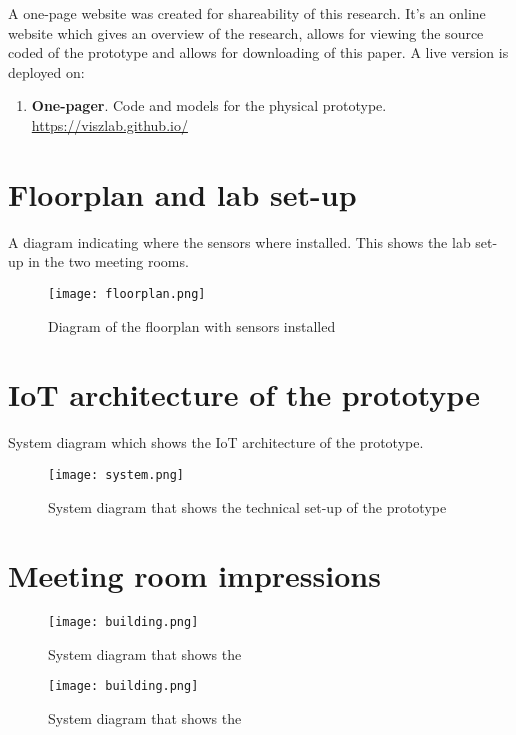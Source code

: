 \begin{appendices}
A one-page website was created for shareability of this research. It's an online website which gives an overview of the research, allows for viewing the source coded of the prototype and allows for downloading of this paper. A live version is deployed on:

\begin{enumerate}
  \item \textbf{One-pager}. Code and models for the physical prototype.\\
  \underline{https://viszlab.github.io/}
\end{enumerate}

\pagebreak

\section{Floorplan and lab set-up}
\label{sec:apx:first_appendix}

A diagram indicating where the sensors where installed. This shows the lab set-up in the two meeting rooms.

\begin{figure}[H]
    \centering
    \texttt{[image: floorplan.png]}
    \caption{Diagram of the floorplan with sensors installed}
    \label{fig:timeline}
\end{figure}

\section{IoT architecture of the prototype}
\label{sec:apx:first_appendix}

System diagram which shows the IoT architecture of the prototype.

\begin{figure}[H]
    \centering
    \texttt{[image: system.png]}
    \caption{System diagram that shows the technical set-up of the prototype}
    \label{fig:timeline}
\end{figure}

\pagebreak

\section{Meeting room impressions}
\label{sec:apx:first_appendix}

\begin{figure}[H]
\begin{minipage}{.5\textwidth}
    \centering
    \texttt{[image: building.png]}
    \caption{System diagram that shows the }
    \label{fig:timeline}
\end{minipage}%
\begin{minipage}{.5\textwidth}
    \centering
    \texttt{[image: building.png]}
    \caption{System diagram that shows the }
    \label{fig:timeline}
\end{minipage}%
\end{figure}


\end{appendices}

